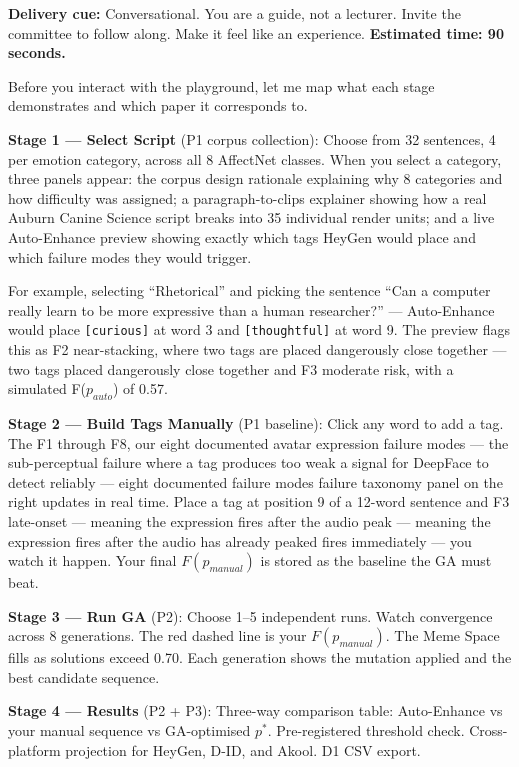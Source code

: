 \documentclass[12pt,a4paper]{article}
\begin{document}
\begin{cuebox}
\textbf{Delivery cue:} Conversational. You are a guide, not a lecturer.
Invite the committee to follow along. Make it feel like an experience.
\textbf{Estimated time: 90 seconds.}
\end{cuebox}

\begin{speechbox}
Before you interact with the playground, let me map what each stage demonstrates and which
paper it corresponds to.

\textbf{Stage 1 --- Select Script} (P1 corpus collection): Choose from 32 sentences, 4 per
emotion category, across all 8 AffectNet classes. When you select a category, three panels
appear: the corpus design rationale explaining why 8 categories and how difficulty was assigned;
a paragraph-to-clips explainer showing how a real Auburn Canine Science script breaks into 35
individual render units; and a live Auto-Enhance preview showing exactly which tags HeyGen
would place and which failure modes they would trigger.

For example, selecting ``Rhetorical'' and picking the sentence ``Can a computer really learn
to be more expressive than a human researcher?'' --- Auto-Enhance would place
\texttt{[curious]} at word 3 and \texttt{[thoughtful]} at word 9. The preview flags this
as F2 near-stacking, where two tags are placed dangerously close together — two tags placed dangerously close together and F3 moderate risk, with a simulated F($p_{auto}$) of 0.57.

\textbf{Stage 2 --- Build Tags Manually} (P1 baseline): Click any word to add a tag.
The F1 through F8, our eight documented avatar expression failure modes — the sub-perceptual failure where a tag produces too weak a signal for DeepFace to detect reliably — eight documented failure modes failure taxonomy panel on the right updates in real time. Place a tag at position 9
of a 12-word sentence and F3 late-onset — meaning the expression fires after the audio peak — meaning the expression fires after the audio has already peaked fires immediately --- you watch it happen. Your final
$F(p_{manual})$ is stored as the baseline the GA must beat.

\textbf{Stage 3 --- Run GA} (P2): Choose 1--5 independent runs. Watch convergence across 8
generations. The red dashed line is your $F(p_{manual})$. The Meme Space fills as solutions
exceed 0.70. Each generation shows the mutation applied and the best candidate sequence.

\textbf{Stage 4 --- Results} (P2 + P3): Three-way comparison table: Auto-Enhance vs your
manual sequence vs GA-optimised $p^*$. Pre-registered threshold check. Cross-platform
projection for HeyGen, D-ID, and Akool. D1 CSV export.
\end{speechbox}
\end{document}
